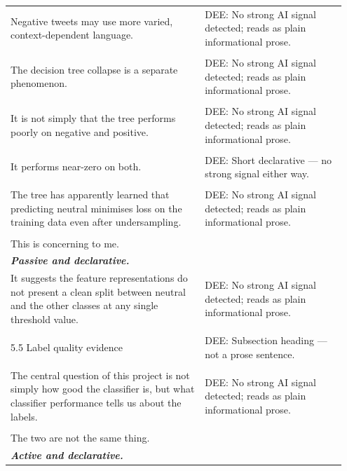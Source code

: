 \documentclass[11pt]{article}
\begin{document}
\begin{longtable}{|p{0.55\linewidth}|p{0.40\linewidth}|}
\hline
\rule{0pt}{3.5cm} & \\
\hline
Negative tweets may use more varied, context-dependent language. & DEE: No strong AI signal detected; reads as plain informational prose. \\[2pt]
\hline
\rule{0pt}{3.5cm} & \\
\hline
The decision tree collapse is a separate phenomenon. & DEE: No strong AI signal detected; reads as plain informational prose. \\[2pt]
\hline
\rule{0pt}{3.5cm} & \\
\hline
It is not simply that the tree performs poorly on negative and positive. & DEE: No strong AI signal detected; reads as plain informational prose. \\[2pt]
\hline
\rule{0pt}{3.5cm} & \\
\hline
It performs near-zero on both. & DEE: Short declarative --- no strong signal either way. \\[2pt]
\hline
\rule{0pt}{3.5cm} & \\
\hline
The tree has apparently learned that predicting neutral minimises loss on the training data even after undersampling. & DEE: No strong AI signal detected; reads as plain informational prose. \\[2pt]
\hline
\rule{0pt}{3.5cm} & \\
\hline
This is concerning to me. & \\[2pt]
\hline
\textbf{\textit{Passive and declarative.}}\vspace{2em} & \\
\hline
It suggests the feature representations do not present a clean split between neutral and the other classes at any single threshold value. & DEE: No strong AI signal detected; reads as plain informational prose. \\[2pt]
\hline
\rule{0pt}{3.5cm} & \\
\hline
5.5 Label quality evidence & DEE: Subsection heading --- not a prose sentence. \\[2pt]
\hline
\rule{0pt}{3.5cm} & \\
\hline
The central question of this project is not simply how good the classifier is, but what classifier performance tells us about the labels. & DEE: No strong AI signal detected; reads as plain informational prose. \\[2pt]
\hline
\rule{0pt}{3.5cm} & \\
\hline
The two are not the same thing. & \\[2pt]
\hline
\textbf{\textit{Active and declarative.}}\vspace{2em} & \\

\end{longtable}
\end{document}
